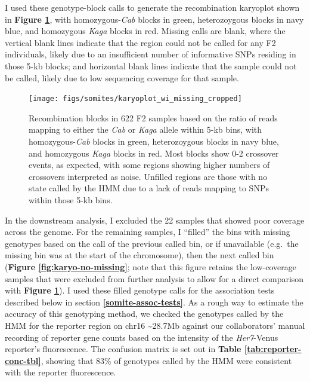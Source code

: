 \documentclass[
]{book}
\begin{document}
I used these genotype-block calls to generate the recombination karyoplot shown in \textbf{Figure \ref{fig:karyo-wi-missing}}, with homozygous-\emph{Cab} blocks in green, heterozoygous blocks in navy blue, and homozygous \emph{Kaga} blocks in red. Missing calls are blank, where the vertical blank lines indicate that the region could not be called for any F2 individuals, likely due to an insufficient number of informative SNPs residing in those 5-kb blocks; and horizontal blank lines indicate that the sample could not be called, likely due to low sequencing coverage for that sample.



\begin{figure}
\texttt{[image: figs/somites/karyoplot\_wi\_missing\_cropped]} \caption{Recombination blocks in 622 F2 samples based on the ratio of reads mapping to either the \emph{Cab} or \emph{Kaga} allele within 5-kb bins, with homozygous-\emph{Cab} blocks in green, heterozoygous blocks in navy blue, and homozygous \emph{Kaga} blocks in red. Most blocks show 0-2 crossover events, as expected, with some regions showing higher numbers of crossovers interpreted as noise. Unfilled regions are those with no state called by the HMM due to a lack of reads mapping to SNPs within those 5-kb bins.}\label{fig:karyo-wi-missing}
\end{figure}

In the downstream analysis, I excluded the 22 samples that showed poor coverage across the genome. For the remaining samples, I ``filled'' the bins with missing genotypes based on the call of the previous called bin, or if unavailable (e.g.~the missing bin was at the start of the chromosome), then the next called bin (\textbf{Figure \ref{fig:karyo-no-missing}}; note that this figure retains the low-coverage samples that were excluded from further analysis to allow for a direct comparison with \textbf{Figure \ref{fig:karyo-wi-missing}}). I used these filled genotype calls for the association tests described below in section \textbf{\ref{somite-assoc-tests}}. As a rough way to estimate the accuracy of this genotyping method, we checked the genotypes called by the HMM for the reporter region on chr16 \textasciitilde28.7Mb against our collaborators' manual recording of reporter gene counts based on the intensity of the \emph{Her7}-Venus reporter's fluorescence. The confusion matrix is set out in \textbf{Table \ref{tab:reporter-conc-tbl}}, showing that 83\% of genotypes called by the HMM were consistent with the reporter fluorescence.
\end{document}
